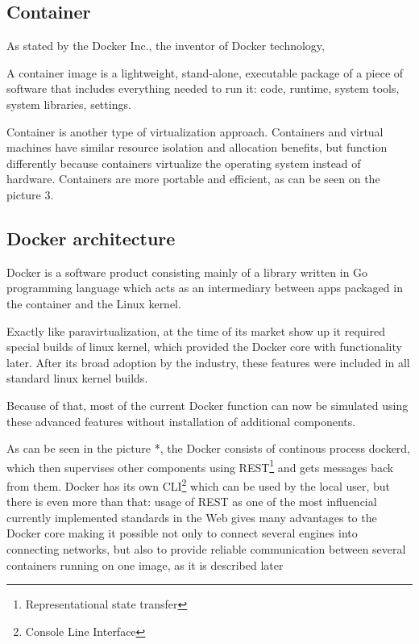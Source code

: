 \subsection{Container}

As stated by the Docker Inc., the inventor of Docker technology,

\begin{definition}
A container image is a lightweight, stand-alone,
executable package of a piece of software that includes everything
needed to run it: code, runtime,
system tools, system libraries, settings. \cite{DockerDefinition}
\end{definition}

Container is another type of virtualization approach.
Containers and virtual machines have
similar resource isolation and allocation benefits,
but function differently because containers
virtualize the operating system instead of hardware.
Containers are more portable and efficient,
as can be seen on the picture 3.

\subsection{Docker architecture}

Docker is a software product consisting mainly of a
library written in Go programming language
which acts as an intermediary between apps packaged
in the container and the Linux kernel.

Exactly like paravirtualization, at the time of its market show up
it required special builds of linux kernel, which provided the Docker core with
functionality later. After its broad adoption by the industry, these features
were included in all standard linux kernel builds.

Because of that, most of the current Docker function can now be simulated
using these advanced features without installation of additional components.

As can be seen in the picture *, the Docker consists
of continous process dockerd, which then supervises other
components using REST\footnote{Representational state transfer}
and gets messages back from them. Docker has its
own CLI\footnote{Console Line Interface} which can be used by the local
user, but there is even more than that:
usage of REST as one of the most influencial currently implemented
standards in the Web gives many advantages to the Docker core making it possible
not only to connect several engines into connecting networks,
but also to provide reliable communication between several containers running on
one image, as it is described later

